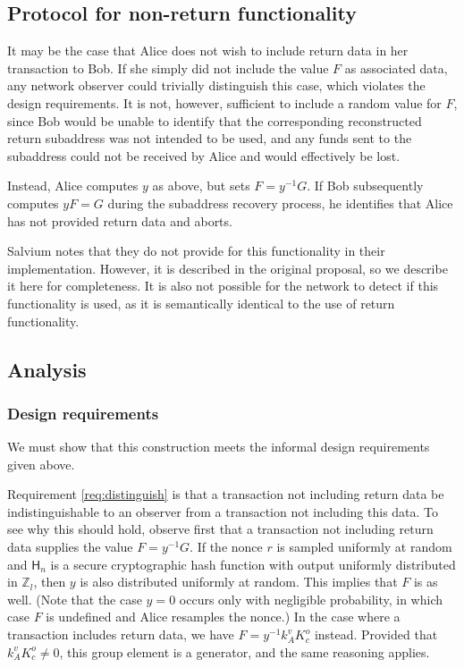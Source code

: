 \documentclass{article}
\newcommand{\hash}{\mathsf{H}_n}
\begin{document}
\subsection{Protocol for non-return functionality}

It may be the case that Alice does not wish to include return data in her transaction to Bob.
If she simply did not include the value $F$ as associated data, any network observer could trivially distinguish this case, which violates the design requirements.
It is not, however, sufficient to include a random value for $F$, since Bob would be unable to identify that the corresponding reconstructed return subaddress was not intended to be used, and any funds sent to the subaddress could not be received by Alice and would effectively be lost.

Instead, Alice computes $y$ as above, but sets $F = y^{-1} G$.
If Bob subsequently computes $y F = G$ during the subaddress recovery process, he identifies that Alice has not provided return data and aborts.

Salvium notes that they do not provide for this functionality in their implementation.
However, it is described in the original proposal, so we describe it here for completeness.
It is also not possible for the network to detect if this functionality is used, as it is semantically identical to the use of return functionality.


\subsection{Analysis}


\subsubsection{Design requirements}

We must show that this construction meets the informal design requirements given above.

Requirement \ref{req:distinguish} is that a transaction not including return data be indistinguishable to an observer from a transaction not including this data.
To see why this should hold, observe first that a transaction not including return data supplies the value $F = y^{-1} G$.
If the nonce $r$ is sampled uniformly at random and $\hash$ is a secure cryptographic hash function with output uniformly distributed in $\mathbb{Z}_l$, then $y$ is also distributed uniformly at random.
This implies that $F$ is as well.
(Note that the case $y = 0$ occurs only with negligible probability, in which case $F$ is undefined and Alice resamples the nonce.)
In the case where a transaction includes return data, we have $F = y^{-1} k_A^v K_c^o$ instead.
Provided that $k_A^v K_c^o \neq 0$, this group element is a generator, and the same reasoning applies.
\end{document}
